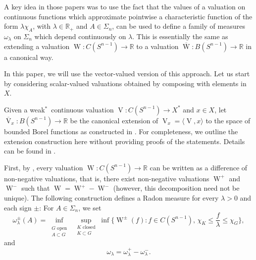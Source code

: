 \documentclass[11pt, a4paper]{amsart}
\newcommand{\sn}{{S^{n-1}}}
\newcommand{\oV}{\operatorname{V}}
\newcommand{\oW}{\operatorname{W}}
\newcommand{\R}{\mathbb R}
\begin{document}
A key idea in those papers was to use the fact that the values of a valuation on continuous functions which approximate pointwise a characteristic function of the form $\lambda \chi_A$, with $\lambda\in\R_{\scriptscriptstyle +}$ and $A\in\Sigma_n$, can be used to define a family of measures $\omega_\lambda$ on $\Sigma_n$ which depend continuously on $\lambda$. This is essentially the same as extending a valuation $\oW\colon C(\sn )\to \R$ to a valuation $\overline{\oW}\colon B(\sn )\to \R$ in a canonical way.  

In this paper, we will use the vector-valued version of this approach. Let us start by considering scalar-valued valuations obtained by composing with elements in $X$.   


Given a weak$^*$~continuous valuation $\oV\colon C(\sn )\to X^*$ and $x\in X$, let $\overline{\oV}_x\colon B(\sn )\to \R$ be the canonical extension of $\oV_x=\langle \oV,x\rangle$ to the space of bounded Borel functions as constructed in \cite{TrViJMAA}. For completeness, we outline the extension construction here without providing proofs of the statements. Details can be found in \cite{TrViJMAA}.


First, by \cite[Theorem 1.3]{TrViJMAA}, every valuation $\oW\colon C(\sn )\to \R$ can be written as a difference of non-negative valuations, that is, there exist non-negative valuations $\oW^+$ and $\oW^-$ such that  $\oW=\oW^+- \oW^-$ (however, this decomposition need not be unique). The following construction defines a Radon measure for every $\lambda > 0$ and each sign $\pm$: For $A\in\Sigma_n$, we set
\begin{equation}\label{eq:def nu lambda+}
\omega_{\lambda}^{\pm}(A)=
\inf_{\substack{\\ G \text{ open} \\ A\subset G}}\,\,
\sup_{\substack{K \text{ closed}\\[1pt]
K\subset G}} \inf\Big\{\oW^{\pm}(f)\colon f\in C(\sn ),\,\chi_K\leq \frac{f}{\lambda} \leq \chi_G \Big\},
\end{equation}
and 
\begin{equation}\label{eq:def nu lambda}
    \omega_{\lambda}=\omega^+_{\lambda}-\omega^-_{\lambda}.
\end{equation}
\end{document}
